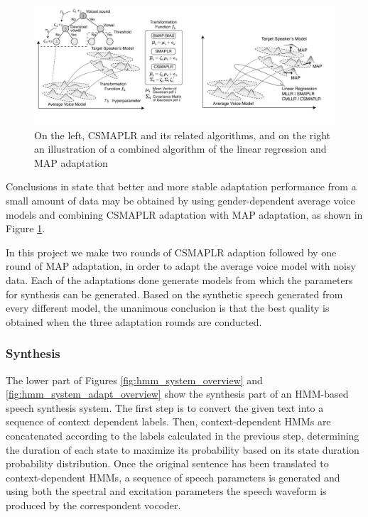 \begin{figure}[!htb]
\begin{centering}
\includegraphics[width=\textwidth]{images/csmaplr_map.jpg}
\caption{On the left, CSMAPLR and its related algorithms, and on the right an illustration of a combined algorithm of the linear regression and MAP adaptation \cite{yamagishi2009}}
\label{fig:csmaplr_map}
\end{centering}
\end{figure}

Conclusions in \cite{yamagishi2009} state that better and more stable adaptation performance from a small amount of data may be obtained by using gender-dependent average voice models and combining CSMAPLR adaptation with MAP adaptation, as shown in Figure \ref{fig:csmaplr_map}.

In this project we make two rounds of CSMAPLR adaption followed by one round of MAP adaptation, in order to adapt the average voice model with noisy data.
%
Each of the adaptations done generate models from which the parameters for synthesis can be generated.
%
Based on the synthetic speech generated from every different model, the unanimous conclusion is that the best quality is obtained when the three adaptation rounds are conducted. 

\subsubsection{Synthesis}
\label{hmm_synthesis_synthesis}
The lower part of Figures \ref{fig:hmm_system_overview} and \ref{fig:hmm_system_adapt_overview} show the synthesis part of an HMM-based speech synthesis system.
%
The first step is to convert the given text into a sequence of context dependent labels.
%
Then, context-dependent HMMs are concatenated according to the labels calculated in the previous step, determining the duration of each state to maximize its probability based on its state duration probability distribution.
%
Once the original sentence has been translated to context-dependent HMMs, a sequence of speech parameters is generated and using both the spectral and excitation parameters the speech waveform is produced by the correspondent vocoder. 